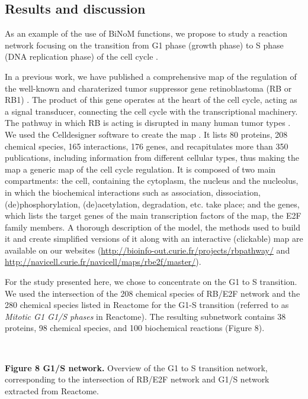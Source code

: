 \documentclass[11pt]{bmc_article_s50}
\newenvironment{bmcformat}{\begin{raggedright}\baselineskip20pt\sloppy\setboolean{publ}{false}}{\end{raggedright}\baselineskip20pt\sloppy}
\begin{document}
\begin{bmcformat}
\section*{Results and discussion}
As an example of the use of BiNoM functions, we propose to study a reaction network focusing on the transition from G1 phase
(growth phase) to S phase (DNA replication phase) of the cell cycle
\cite{calzone2008comprehensive}.

In a previous work, we have published a comprehensive map of the regulation of the well-known and charaterized tumor
suppressor gene retinoblastoma (RB or RB1) \cite{calzone2008comprehensive}. The product of this gene operates at
the heart of the cell cycle, acting as a signal transducer, connecting the
cell cycle with the transcriptional machinery. The pathway in which RB is
acting is disrupted in many human tumor types \cite{weinberg1995retinoblastoma}.
We used the Celldesigner software to create the map \cite{funahashi2003celldesigner}. It lists 80 proteins, 208 chemical species, 165
interactions, 176 genes, and recapitulates more than 350 publications, including
information from different cellular types, thus making the map a generic map of
the cell cycle regulation. It is composed of two main compartments: the cell,
containing the cytoplasm, the nucleus and the nucleolus, in which the
biochemical interactions such as association, dissociation, (de)phosphorylation,
(de)acetylation, degradation, etc. take place; and the genes, which lists the
target genes of the main transcription factors of the map, the E2F family
members.
A thorough description of the model, the methods used to build it and create
simplified versions of it along with an interactive (clickable) map are
available on our websites
(\url{http://bioinfo-out.curie.fr/projects/rbpathway/} and \url{http://navicell.curie.fr/navicell/maps/rbe2f/master/}).

For the study presented here, we chose to concentrate on the G1 to S transition. We
used the intersection of the 208 chemical species
of RB/E2F network and the 280 chemical species listed in Reactome \cite{joshi2005reactome} for the G1-S transition
(referred to as \emph{Mitotic G1 G1/S phases} in Reactome). The resulting
subnetwork contains 38 proteins, 98 chemical species, and 100 biochemical
reactions (Figure 8).

\hrulefill\

\vspace*{-15pt}
\textbf{Figure 8 G1/S network.}
Overview of the G1 to S transition network, corresponding to the intersection of
RB/E2F network and G1/S network extracted from Reactome.
\vspace*{-21pt}


\end{bmcformat}
\end{document}
